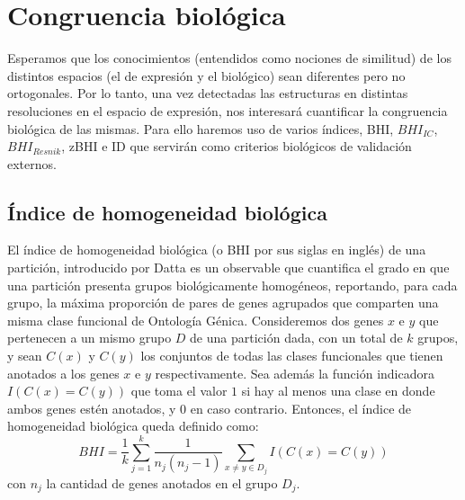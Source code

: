 \chapter{Congruencia biológica}
Esperamos que los conocimientos (entendidos como nociones de similitud) de los distintos espacios (el de expresión y el biológico) sean diferentes pero no ortogonales. Por lo tanto, una vez detectadas las estructuras en distintas resoluciones en el espacio de expresión, nos interesará cuantificar la congruencia biológica de las mismas. Para ello haremos uso de varios índices, BHI, $BHI_{IC}$, $BHI_{Resnik}$, zBHI e ID que servirán como criterios biológicos de validación externos.

\section{Índice de homogeneidad biológica}
El índice de homogeneidad biológica (o BHI por sus siglas en inglés) de una partición, introducido por Datta \cite{Datta2006} es un observable que cuantifica el grado en que una partición presenta grupos biológicamente homogéneos, reportando, para cada grupo, la máxima proporción de pares de genes agrupados que comparten una misma clase funcional de Ontología Génica. Consideremos dos genes $x$ e $y$ que pertenecen a un mismo grupo $D$ de una partición dada, con un total de $k$ grupos, y sean $C(x)$ y $C(y)$ los conjuntos de todas las clases funcionales que tienen anotados a los genes $x$ e $y$ respectivamente. Sea además la función indicadora $I(C(x)=C(y))$ que toma el valor $1$ si hay al menos una clase en donde ambos genes estén anotados, y $0$ en caso contrario. Entonces, el índice de homogeneidad biológica queda definido como:
\begin{equation}
	BHI = \frac{1}{k}\sum\limits_{j=1}^k\frac{1}{n_j(n_j-1)}\sum\limits_{x\neq y\in D_j}I(C(x)=C(y))
\end{equation}
con $n_j$ la cantidad de genes anotados en el grupo $D_j$.\\

